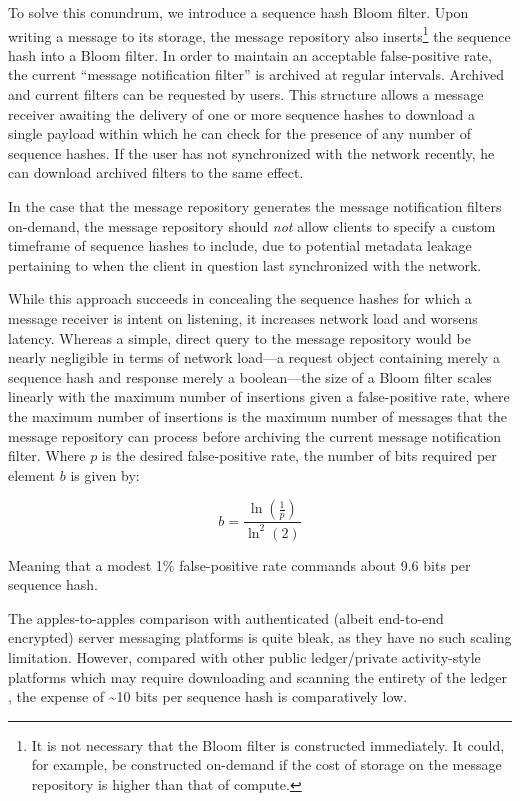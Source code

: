 To solve this conundrum, we introduce a sequence hash Bloom filter. \parencite{bloom_space_1970} Upon writing a message to its storage, the message repository also inserts\footnote{It is not necessary that the Bloom filter is constructed immediately. It could, for example, be constructed on-demand if the cost of storage on the message repository is higher than that of compute.} the sequence hash into a Bloom filter. In order to maintain an acceptable false-positive rate, the current ``message notification filter'' is archived at regular intervals. Archived and current filters can be requested by users. This structure allows a message receiver awaiting the delivery of one or more sequence hashes to download a single payload within which he can check for the presence of any number of sequence hashes. If the user has not synchronized with the network recently, he can download archived filters to the same effect.

In the case that the message repository generates the message notification filters on-demand, the message repository should \emph{not} allow clients to specify a custom timeframe of sequence hashes to include, due to potential metadata leakage pertaining to when the client in question last synchronized with the network.

While this approach succeeds in concealing the sequence hashes for which a message receiver is intent on listening, it increases network load and worsens latency. Whereas a simple, direct query to the message repository would be nearly negligible in terms of network load---a request object containing merely a sequence hash and response merely a boolean---the size of a Bloom filter scales linearly with the maximum number of insertions given a false-positive rate, where the maximum number of insertions is the maximum number of messages that the message repository can process before archiving the current message notification filter. Where $p$ is the desired false-positive rate, the number of bits required per element $b$ is given by:

$$ b = \frac { \ln \left( \frac{1}{p} \right) }
  {\ln ^2 \left( 2 \right) } $$

Meaning that a modest 1\% false-positive rate commands about 9.6 bits per sequence hash. \parencite{cortesi_3_2010}

The apples-to-apples comparison with authenticated (albeit end-to-end encrypted) server messaging platforms is quite bleak, as they have no such scaling limitation. However, compared with other public ledger/private activity-style platforms which may require downloading and scanning the entirety of the ledger \parencite{monerohow_low_level_2024}, the expense of \textasciitilde10 bits per sequence hash is comparatively low.

